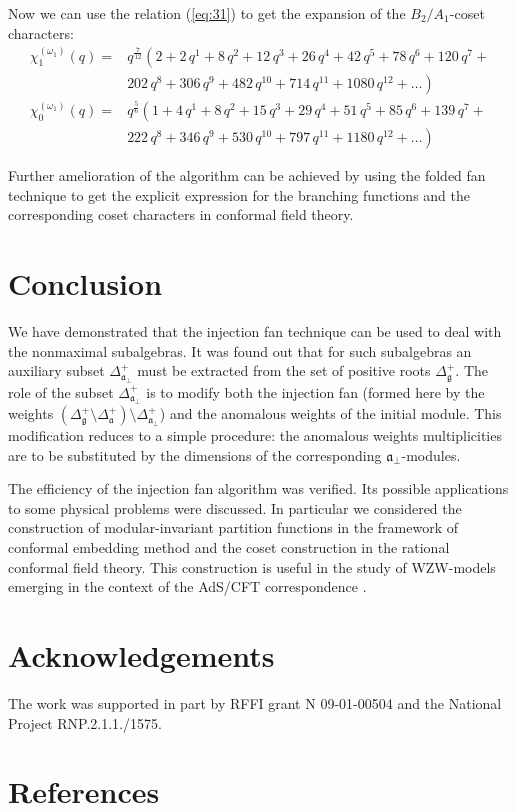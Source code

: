 \documentclass[12pt]{iopart}
\theoremstyle{definition}
\newcommand{\af}{\mathfrak{a}}
\newcommand{\afb}{\mathfrak{a}_{\bot}}
\begin{document}
Now we can use the relation (\ref{eq:31}) to get the expansion of the $B_2/A_1$-coset characters:
\begin{equation*}
  \label{eq:35}
  \begin{array}{cc}
    \chi^{(\omega_1)}_{1}(q)= & q^{\frac{7}{12}}\left( 2+2\,q^{1}+8\,q^{2}+12\,q^{3}+26\,q^{4}+42\,q^{5}+78\,q^{6}+120\,q^{7}+\right. \\
    & \left. 202\,q^{8}+306\,q^{9}+482\,q^{10}+714\,q^{11}+1080\,q^{12}+\dots \right)\\
    \chi^{(\omega_1)}_{0}(q) = & q^{\frac{5}{6}}\left(1 + 4\,q^{1}+ 8\,q^{2}+ 15\,q^{3}+ 29\,q^{4}+ 51\,q^{5}+ 85\,q^{6}+ 139\,q^{7}+\right. \\
    &\left. 222\,q^{8}+ 346\,q^{9}+ 530\,q^{10}+ 797\,q^{11}+ 1180\,q^{12}+\dots\right)
  \end{array}
\end{equation*}

Further amelioration of the algorithm can be achieved by using
the folded fan technique \cite{il2010folded} to get the explicit expression
for the branching functions and the corresponding coset characters in conformal field theory.

\section{Conclusion}
\label{sec:conclusion}
We have demonstrated that the injection fan technique can be used to deal with the nonmaximal subalgebras.
It was found out that for such subalgebras an auxiliary subset $\Delta^{+}_{\afb}$ must be extracted
from the set of positive roots $\Delta_{\mathfrak{g}}^{+}$.
The role of the subset $\Delta^{+}_{\afb}$ is to modify both the injection fan (formed here by the
weights $\left(\Delta_{\mathfrak{g}}^{+} \setminus  \Delta_{\af}^{+}\right) \setminus \Delta^{+}_{\afb}$)
and the anomalous weights of the initial module.
This modification reduces to a simple procedure:
the anomalous weights multiplicities are to be substituted by the dimensions of the corresponding $\afb$-modules.

The efficiency of the injection fan algorithm was verified.
Its possible applications to some physical problems were discussed.
In particular we considered the construction of modular-invariant partition functions
in the framework of conformal embedding method and the coset construction in the rational conformal field theory.
This construction is useful in the study of WZW-models
emerging in the context of the AdS/CFT correspondence \cite{Maldacena:2000hw,Maldacena:2000kv,Maldacena:2001km}.

\section{Acknowledgements}
The work was supported in
part by RFFI grant N 09-01-00504 and the National Project RNP.2.1.1./1575.

\section*{References}
{}

\end{document}
